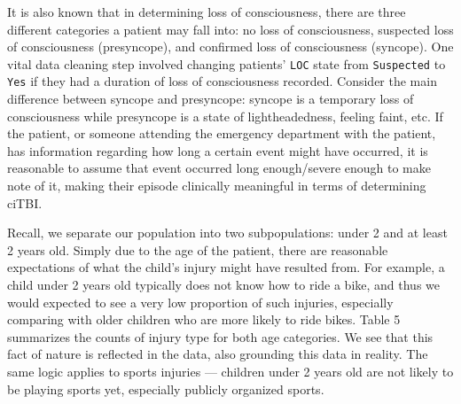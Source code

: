 \documentclass[10pt,letterpaper]{article}
\begin{document}
It is also known that in determining loss of consciousness, there are three different categories a patient may fall into: no loss of consciousness, suspected loss of consciousness (presyncope), and confirmed loss of consciousness (syncope). One vital data cleaning step involved changing patients' \texttt{LOC} state from \texttt{Suspected} to \texttt{Yes} if they had a duration of loss of consciousness recorded. Consider the main difference between syncope and presyncope: syncope is a temporary loss of consciousness while presyncope is a state of lightheadedness, feeling faint, etc. If the patient, or someone attending the emergency department with the patient, has information regarding how long a certain event might have occurred, it is reasonable to assume that event occurred long enough/severe enough to make note of it, making their episode clinically meaningful in terms of determining ciTBI.

Recall, we separate our population into two subpopulations: under 2 and at least 2 years old. Simply due to the age of the patient, there are reasonable expectations of what the child's injury might have resulted from. For example, a child under 2 years old typically does not know how to ride a bike, and thus we would expected to see a very low proportion of such injuries, especially comparing with older children who are more likely to ride bikes. Table 5 summarizes the counts of injury type for both age categories. We see that this fact of nature is reflected in the data, also grounding this data in reality. The same logic applies to sports injuries --- children under 2 years old are not likely to be playing sports yet, especially publicly organized sports.
\end{document}
